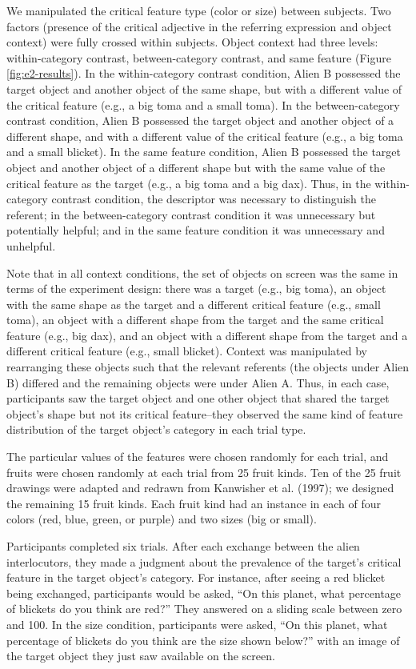 \documentclass{ucetd}
\begin{document}
We manipulated the critical feature type (color or size) between
subjects. Two factors (presence of the critical adjective in the
referring expression and object context) were fully crossed within
subjects. Object context had three levels: within-category contrast,
between-category contrast, and same feature (Figure
\ref{fig:e2-results}). In the within-category contrast condition, Alien
B possessed the target object and another object of the same shape, but
with a different value of the critical feature (e.g., a big toma and a
small toma). In the between-category contrast condition, Alien B
possessed the target object and another object of a different shape, and
with a different value of the critical feature (e.g., a big toma and a
small blicket). In the same feature condition, Alien B possessed the
target object and another object of a different shape but with the same
value of the critical feature as the target (e.g., a big toma and a big
dax). Thus, in the within-category contrast condition, the descriptor
was necessary to distinguish the referent; in the between-category
contrast condition it was unnecessary but potentially helpful; and in
the same feature condition it was unnecessary and unhelpful.

Note that in all context conditions, the set of objects on screen was
the same in terms of the experiment design: there was a target (e.g.,
big toma), an object with the same shape as the target and a different
critical feature (e.g., small toma), an object with a different shape
from the target and the same critical feature (e.g., big dax), and an
object with a different shape from the target and a different critical
feature (e.g., small blicket). Context was manipulated by rearranging
these objects such that the relevant referents (the objects under Alien
B) differed and the remaining objects were under Alien A. Thus, in each
case, participants saw the target object and one other object that
shared the target object's shape but not its critical feature--they
observed the same kind of feature distribution of the target object's
category in each trial type.

The particular values of the features were chosen randomly for each
trial, and fruits were chosen randomly at each trial from 25 fruit
kinds. Ten of the 25 fruit drawings were adapted and redrawn from
Kanwisher et al. (1997); we designed the remaining 15 fruit kinds. Each
fruit kind had an instance in each of four colors (red, blue, green, or
purple) and two sizes (big or small).

Participants completed six trials. After each exchange between the alien
interlocutors, they made a judgment about the prevalence of the target's
critical feature in the target object's category. For instance, after
seeing a red blicket being exchanged, participants would be asked, ``On
this planet, what percentage of blickets do you think are red?'' They
answered on a sliding scale between zero and 100. In the size condition,
participants were asked, ``On this planet, what percentage of blickets
do you think are the size shown below?'' with an image of the target
object they just saw available on the screen.
\end{document}
